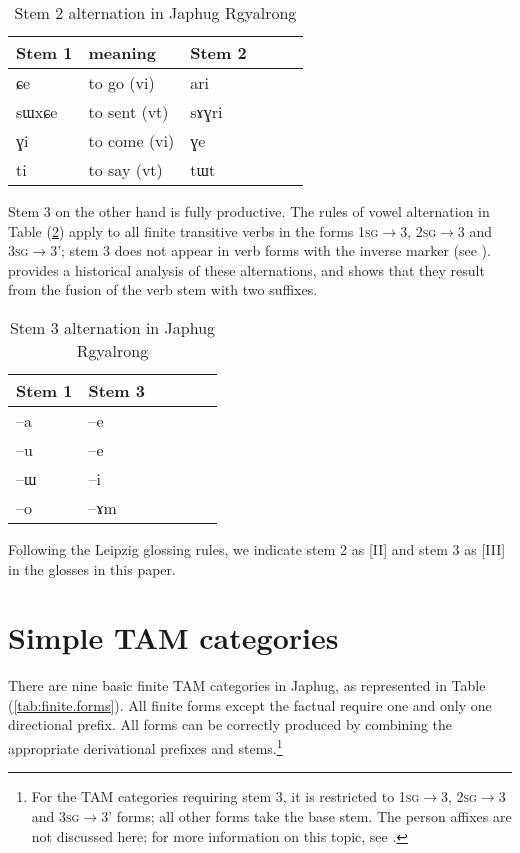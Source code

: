 \documentclass[oldfontcommands,oneside,a4paper,11pt]{article}
\newcommand{\ipa}[1]{{\phon \mbox{#1}}} %
\newcommand{\refb}[1]{(\ref{#1})}
\begin{document}
 \begin{table} 
\caption{Stem 2 alternation in Japhug Rgyalrong} \label{tab:stem2} \centering
\begin{tabular}{llllll}
\toprule
Stem 1 & meaning &Stem 2 \\
\midrule
\ipa{ɕe}& to go (vi)&  \ipa{ari} \\
\ipa{sɯxɕe}& to sent (vt)  &\ipa{sɤɣri} \\
\ipa{ɣi}& to come (vi)  &\ipa{ɣe} \\
\ipa{ti}& to say (vt)  &\ipa{tɯt} \\
\bottomrule
\end{tabular}
\end{table}


Stem 3 on the other hand is fully productive. The rules of vowel alternation in Table \refb{tab:stem3} apply to all finite transitive verbs in the forms \textsc{1sg}$\rightarrow$3, \textsc{2sg}$\rightarrow$3 and \textsc{3sg}$\rightarrow$3'; stem 3 does not appear in verb forms with the inverse marker (see \citealt{gongxun14agreement}). \citet[351-7]{jacques04these} provides a historical analysis of these alternations, and shows that they result from the fusion of the verb stem with two suffixes. %

 \begin{table} 
\caption{Stem 3 alternation in Japhug Rgyalrong} \label{tab:stem3} \centering
\begin{tabular}{llllll}
\toprule
Stem 1 & Stem 3 \\
\midrule
\ipa{--a} & \ipa{--e} \\
\ipa{--u} & \ipa{--e} \\
\ipa{--ɯ} & \ipa{--i} \\
\ipa{--o} & \ipa{--ɤm} \\
\bottomrule
\end{tabular}
\end{table}

Following the Leipzig glossing rules, we indicate stem 2 as [II] and stem 3 as [III] in the glosses in this paper.

\section{Simple TAM categories} \label{sec:finite.TAM}

There are nine basic finite TAM categories in Japhug, as represented in Table \refb{tab:finite.forms}. All finite forms except the factual require one and only one directional prefix. All forms can be correctly produced by combining the appropriate derivational prefixes and stems.\footnote{For the TAM categories requiring stem 3, it is restricted to  \textsc{1sg}$\rightarrow$3, \textsc{2sg}$\rightarrow$3 and \textsc{3sg}$\rightarrow$3' forms; all other forms take the base stem.  The person affixes  are not discussed here; for  more information on this topic, see \citet{jacques10inverse}.}
\end{document}
